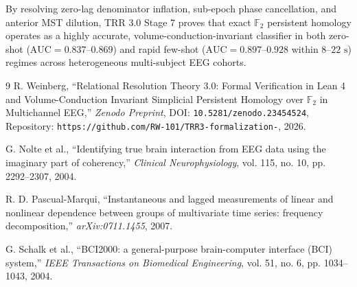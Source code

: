 \documentclass[10pt,twocolumn]{article}
\begin{document}
By resolving zero-lag denominator inflation, sub-epoch phase cancellation, and anterior MST dilution, TRR 3.0 Stage 7 proves that exact $\mathbb{F}_2$ persistent homology operates as a highly accurate, volume-conduction-invariant classifier in both zero-shot ($\mathrm{AUC}=0.837\text{--}0.869$) and rapid few-shot ($\mathrm{AUC}=0.897\text{--}0.928$ within $8\text{--}22\text{ s}$) regimes across heterogeneous multi-subject EEG cohorts.

\begin{thebibliography}{9}
R. Weinberg, ``Relational Resolution Theory 3.0: Formal Verification in Lean 4 and Volume-Conduction Invariant Simplicial Persistent Homology over $\mathbb{F}_2$ in Multichannel EEG,'' \textit{Zenodo Preprint}, DOI: \texttt{10.5281/zenodo.23454524}, Repository: \texttt{https://github.com/RW-101/TRR3-formalization-}, 2026.

G. Nolte et al., ``Identifying true brain interaction from EEG data using the imaginary part of coherency,'' \textit{Clinical Neurophysiology}, vol. 115, no. 10, pp. 2292--2307, 2004.

R. D. Pascual-Marqui, ``Instantaneous and lagged measurements of linear and nonlinear dependence between groups of multivariate time series: frequency decomposition,'' \textit{arXiv:0711.1455}, 2007.

G. Schalk et al., ``BCI2000: a general-purpose brain-computer interface (BCI) system,'' \textit{IEEE Transactions on Biomedical Engineering}, vol. 51, no. 6, pp. 1034--1043, 2004.
\end{thebibliography}

\clearpage
\end{document}
